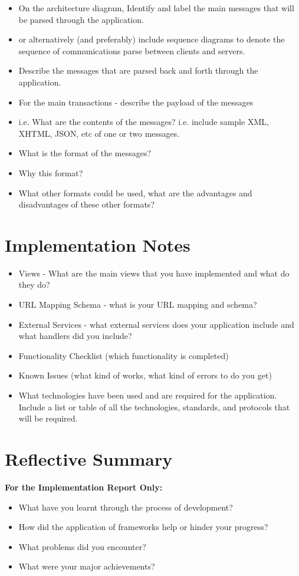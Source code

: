 \documentclass{sig-alt-release2}
\begin{document}
\begin{itemize}

\item	On the architecture diagram, Identify and label the main messages that will be parsed through the application.
\item	or alternatively (and preferably) include sequence diagrams to denote the sequence of communications parse between clients and servers.
\item	Describe the messages that are parsed back and forth through the application.
\item	For the main transactions - describe the payload of the messages 
\item	i.e. What are the contents of the messages? i.e. include sample XML, XHTML, JSON, etc of one or two messages.
\item	What is the format of the messages? 
\item	Why this format? 
\item	What other formats could be used, what are the advantages and disadvantages of these other formats?
\end{itemize}


\section{Implementation Notes}
\label{sec: implementation}

\begin{itemize}
\item Views - What are the main views that you have implemented and what do they do?
\item URL Mapping Schema - what is your URL mapping and schema?
\item External Services  - what external services does your application include and what handlers did you include?
\item	Functionality Checklist (which functionality is completed)
\item	Known Issues (what kind of works, what kind of errors to do you get)
\item What technologies have been used and are required for the application. Include a list or table of all the technologies, standards, and protocols that will be required.
\end{itemize}

\section{Reflective Summary}
{\bf For the Implementation Report Only:}
\begin{itemize}
\item	What have you learnt through the process of development? 
\item	How did the application of frameworks help or hinder your progress? 
\item	What problems did you encounter? 
\item	What were your major achievements?
\end{itemize}
\end{document}
